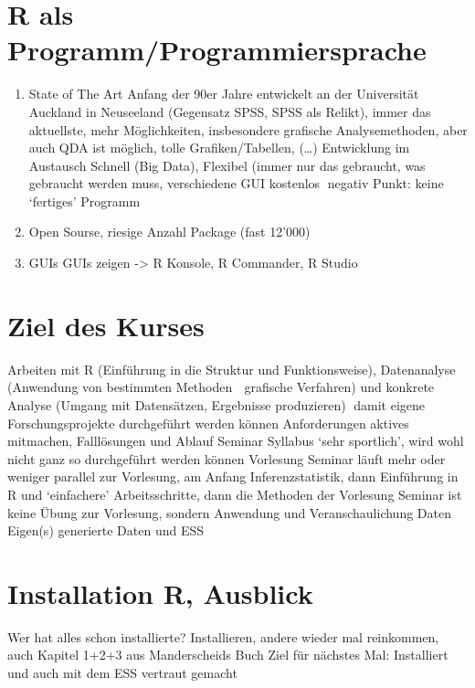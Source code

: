 \documentclass[
]{book}
\providecommand{\tightlist}{%
  \setlength{\itemsep}{0pt}\setlength{\parskip}{0pt}}
\begin{document}
\hypertarget{r-als-programmprogrammiersprache}{%
\section{R als Programm/Programmiersprache}\label{r-als-programmprogrammiersprache}}

\begin{enumerate}
\def\labelenumi{\arabic{enumi}.}
\tightlist
\item
  State of The Art
  Anfang der 90er Jahre entwickelt an der Universität Auckland in Neuseeland (Gegensatz SPSS, SPSS als Relikt), immer das aktuellste, mehr Möglichkeiten, insbesondere grafische Analysemethoden, aber auch QDA ist möglich, tolle Grafiken/Tabellen, (\ldots)
  Entwicklung im Austausch
  Schnell (Big Data), Flexibel (immer nur das gebraucht, was gebraucht werden muss, verschiedene GUI kostenlos
  negativ Punkt: keine `fertiges' Programm
\item
  Open Sourse, riesige Anzahl Package (fast 12'000)
\item
  GUIs
  GUIs zeigen -\textgreater{} R Konsole, R Commander, R Studio
\end{enumerate}

\hypertarget{ziel-des-kurses}{%
\section{Ziel des Kurses}\label{ziel-des-kurses}}

Arbeiten mit R (Einführung in die Struktur und Funktionsweise), Datenanalyse (Anwendung von bestimmten Methoden  grafische Verfahren) und konkrete Analyse (Umgang mit Datensätzen, Ergebnisse produzieren)
damit eigene Forschungsprojekte durchgeführt werden können
Anforderungen
aktives mitmachen, Falllösungen
und Ablauf Seminar
Syllabus
`sehr sportlich', wird wohl nicht ganz so durchgeführt werden können
Vorlesung
Seminar läuft mehr oder weniger parallel zur Vorlesung, am Anfang Inferenzstatistik, dann Einführung in R und `einfachere' Arbeitsschritte, dann die Methoden der Vorlesung
Seminar ist keine Übung zur Vorlesung, sondern Anwendung und Veranschaulichung
Daten
Eigen(s) generierte Daten und ESS

\hypertarget{installation-r-ausblick}{%
\section{Installation R, Ausblick}\label{installation-r-ausblick}}

Wer hat alles schon installierte?
Installieren, andere wieder mal reinkommen, auch Kapitel 1+2+3 aus Manderscheids Buch
Ziel für nächstes Mal: Installiert und auch mit dem ESS vertraut gemacht
\end{document}
